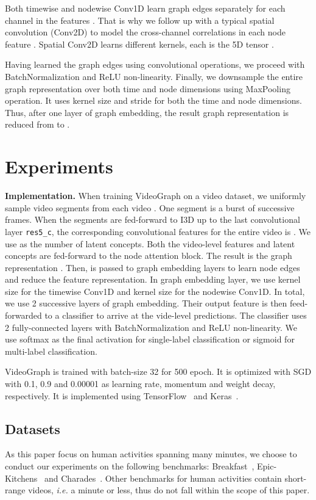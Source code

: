 \documentclass[10pt,twocolumn,letterpaper]{article}
\newcommand{\partitle}[1]{\noindent\textbf{#1}}
\newcommand{\ptspace}{\vspace*{5pt}}
\begin{document}
Both timewise and nodewise Conv1D learn graph edges separately for each channel in the features .
That is why we follow up with a typical spatial convolution (Conv2D) to model the cross-channel correlations in each node feature .
Spatial Conv2D learns  different kernels, each is the 5D tensor .

Having learned the graph edges using convolutional operations, we proceed with BatchNormalization and ReLU non-linearity.
Finally, we downsample the entire graph representation  over both time and node dimensions using MaxPooling operation.
It uses kernel size  and stride  for both the time and node dimensions.
Thus, after one layer of graph embedding, the result graph representation is reduced from  to .

\section{Experiments}\label{sec:experiments}
\ptspace
\partitle{Implementation.}
When training VideoGraph on a video dataset, we uniformly sample  video segments from each video .
One segment  is a burst of  successive frames.
When the  segments are fed-forward to I3D up to the last convolutional layer \texttt{res5\_c}, the corresponding convolutional features for the entire video is .
We use  as the number of latent concepts.
Both the video-level features  and latent concepts  are fed-forward to the node attention block.
The result is the graph representation .
Then,  is passed to graph embedding layers to learn node edges and reduce the feature representation.
In graph embedding layer, we use kernel size  for the timewise Conv1D and kernel size  for the nodewise Conv1D.
In total, we use 2 successive layers of graph embedding.
Their output feature is then feed-forwarded to a classifier to arrive at the vide-level predictions.
The classifier uses 2 fully-connected layers with BatchNormalization and ReLU non-linearity.
We use softmax as the final activation for single-label classification or sigmoid for multi-label classification.

VideoGraph is trained with batch-size 32 for 500 epoch.
It is optimized with SGD with 0.1, 0.9 and 0.00001 as learning rate, momentum and weight decay, respectively.
It is implemented using TensorFlow~\cite{tensorflow2015-whitepaper} and Keras~\cite{chollet2015keras}.

\subsection{Datasets}
As this paper focus on human activities spanning many minutes, we choose to conduct our experiments on the following benchmarks: Breakfast~\cite{kuehne2014language}, Epic-Kitchens~\cite{damen2018scaling} and Charades~\cite{sigurdsson2016hollywood}.
Other benchmarks for human activities contain short-range videos, \textit{i.e.} a minute or less, thus do not fall within the scope of this paper.
\end{document}
